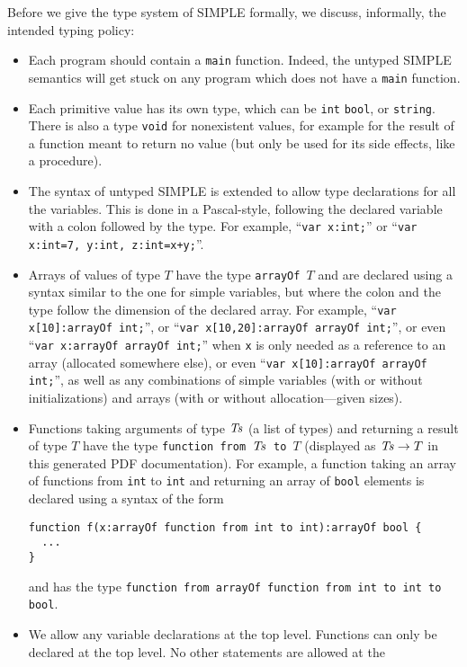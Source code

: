 \begin{latexComment}
Before we give the \K type system of SIMPLE formally, we discuss, informally,
the intended typing policy:
\begin{itemize}
\item Each program should contain a \texttt{main} function.  Indeed, the
untyped SIMPLE semantics will get stuck on any program which does not have a
\texttt{main} function.
\item Each primitive value has its own type, which can be \texttt{int}
\texttt{bool}, or \texttt{string}.  There is also a type \texttt{void} for
nonexistent values, for example for the result of a function meant to return
no value (but only be used for its side effects, like a procedure).
\item The syntax of untyped SIMPLE is extended to allow type declarations for
all the variables.  This is done in a Pascal-style, following the declared
variable with a colon followed by the type.  For example,
``\texttt{var x:int;}'' or ``\texttt{var x:int=7, y:int, z:int=x+y;}''.
\item Arrays of values of type $T$ have the type \texttt{arrayOf $T$} and
are declared using a syntax similar to the one for simple variables, but
where the colon and the type follow the dimension of the declared array.
For example, ``\texttt{var x[10]:arrayOf int;}'', or
``\texttt{var x[10,20]:arrayOf arrayOf int;}'', or even
``\texttt{var x:arrayOf arrayOf int;}'' when \texttt{x} is only needed
as a reference to an array (allocated somewhere else), or even
``\texttt{var x[10]:arrayOf arrayOf int;}'', as well as any combinations of
simple variables (with or without initializations) and arrays (with or without
allocation---given sizes).
\item Functions taking arguments of type $\it Ts$ (a list of types) and
returning a result of type $T$ have the type
\texttt{function from $\it Ts$ to $T$} (displayed as ${\it Ts}\rightarrow T$
in this generated PDF documentation).  For example, a function taking an
array of functions from \texttt{int} to \texttt{int} and returning an array
of \texttt{bool} elements is declared using a syntax of the form
\begin{verbatim}
function f(x:arrayOf function from int to int):arrayOf bool {
  ...
}
\end{verbatim}
and has the type
\texttt{function from arrayOf function from int to int to bool}.
\item We allow any variable declarations at the top level.  Functions can
only be declared at the top level.  No other statements are allowed at the

\end{itemize}
\end{latexComment}
